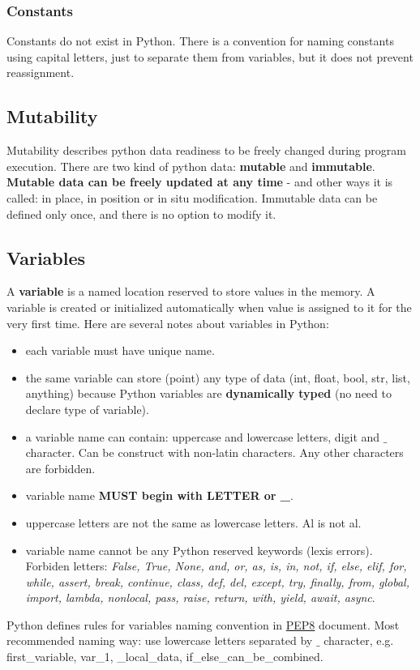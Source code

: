 \documentclass{article}
\begin{document}
	\subsubsection{Constants}
	Constants do not exist in Python. There is a convention for naming constants using capital letters, just to separate them from variables, but it does not prevent reassignment.

	
	\newpage
	\subsection{Mutability}
	Mutability describes python data readiness to be freely changed during program execution. There are two kind of python data: \textbf{mutable} and \textbf{immutable}. \textbf{Mutable data can be freely updated at any time} - and other ways it is called: in place, in position or in situ modification. Immutable data can be defined only once, and there is no option to modify it.

	\newpage
	\subsection{Variables}
	A \textbf{variable} is a named location reserved to store values in the memory. A variable is created or initialized automatically when value is assigned to it for the very first time. Here are several notes about variables in Python:
	\begin{itemize}
	\item each variable must have unique name.
	\item the same variable can store (point) any type of data (int, float, bool, str, list, anything) because Python variables are \textbf{dynamically typed} (no need to declare type of variable).
	\item a variable name can contain: uppercase and lowercase letters, digit and $\_$ character. Can be construct with non-latin characters. Any other characters are forbidden.
	\item variable name \textbf{MUST begin with LETTER or \_}.
	\item uppercase letters are not the same as lowercase letters. Al is not al.
	\item variable name cannot be any Python reserved keywords (lexis errors). Forbiden letters: \textit{False, True, None, and, or, as, is, in, not, if, else, elif, for, while, assert, break, continue, class, def, del, except, try, finally, from, global, import, lambda, nonlocal, pass, raise, return, with, yield, await, async}.
	\end{itemize}
	Python defines rules for variables naming convention in \href{https://peps.python.org/pep-0008/}{PEP8} document. Most recommended naming way: use lowercase letters separated by $\_$ character, e.g. first\_variable, var\_1, \_local\_data, if\_else\_can\_be\_combined.
\end{document}
